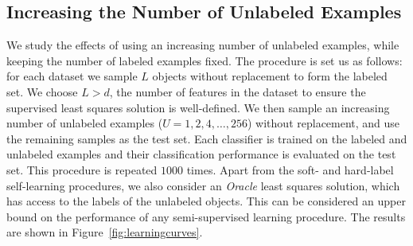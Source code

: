 \documentclass[twoside]{memoir}\usepackage[]{graphicx}\usepackage{xcolor}
\begin{document}
\subsection{Increasing the Number of Unlabeled Examples}
We study the effects of using an increasing number of unlabeled examples, while keeping the number of labeled examples fixed. The procedure is set us as follows: for each dataset we sample $L$ objects without replacement to form the labeled set. We choose $L>d$, the number of features in the dataset to ensure the supervised least squares solution is well-defined. We then sample an increasing number of unlabeled examples ($U=1,2,4,\dots,256$) without replacement, and use the remaining samples as the test set. Each classifier is trained on the labeled and unlabeled examples and their classification performance is evaluated on the test set. This procedure is repeated $1000$ times. Apart from the soft- and hard-label self-learning procedures, we also consider an \emph{Oracle} least squares solution, which has access to the labels of the unlabeled objects. This can be considered an upper bound on the performance of any semi-supervised learning procedure. The results are shown in Figure~\ref{fig:learningcurves}.
\end{document}
